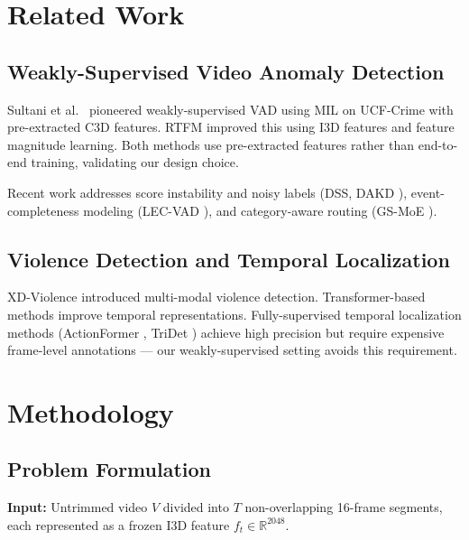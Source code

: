 \documentclass[11pt]{article}
\begin{document}
\section{Related Work}

\subsection{Weakly-Supervised Video Anomaly Detection}
Sultani et al.\ \cite{sultani2018real} pioneered weakly-supervised VAD using MIL on UCF-Crime with pre-extracted C3D features. RTFM \cite{tian2021weakly} improved this using I3D features and feature magnitude learning. Both methods use pre-extracted features rather than end-to-end training, validating our design choice.

Recent work addresses score instability and noisy labels (DSS, DAKD \cite{lan2025dss, wang2025dakd}), event-completeness modeling (LEC-VAD \cite{tian2025lecvad}), and category-aware routing (GS-MoE \cite{wang2025gsmoe}).

\subsection{Violence Detection and Temporal Localization}
XD-Violence \cite{wu2020not} introduced multi-modal violence detection. Transformer-based methods \cite{wu2023surveillance} improve temporal representations. Fully-supervised temporal localization methods (ActionFormer \cite{zhang2022actionformer}, TriDet \cite{shi2023tridet}) achieve high precision but require expensive frame-level annotations --- our weakly-supervised setting avoids this requirement.

\section{Methodology}

\subsection{Problem Formulation}
\textbf{Input:} Untrimmed video $V$ divided into $T$ non-overlapping 16-frame segments, each represented as a frozen I3D feature $f_t \in \mathbb{R}^{2048}$.
\end{document}
